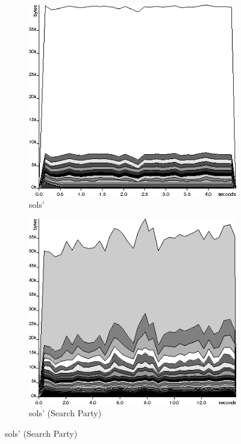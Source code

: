 \begin{figure}[t]
  \begin{subfigure}{0.4\textwidth}
    \includegraphics[width=\textwidth]{space/sols2-orig}
    \caption{sols'}
    \label{fig:searchparty-examples-space:sols2-orig}
  \end{subfigure}
  \begin{subfigure}{0.4\textwidth}
    \includegraphics[width=\textwidth]{space/sols2-sp}
    \caption{sols' (Search Party)}
    \label{fig:searchparty-examples-space:sols2-sp}
  \end{subfigure}


\end{figure}
